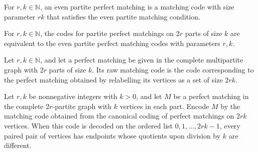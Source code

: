 \begin{definition}
\label{FABL.EvenPartitePerfectMatching}
\leanok
{}
For $r,k\in\mathbb{N}$, an even partite perfect matching is a matching code with size
parameter $rk$ that satisfies the even partite matching condition.
\end{definition}

\begin{definition}
\label{FABL.partitePerfectMatchingEvenEquiv}
\leanok
{}
For $r,k\in\mathbb{N}$, the codes for partite perfect matchings on $2r$ parts of size
$k$ are equivalent to the even partite perfect matching codes with parameters $r,k$.
\end{definition}

\begin{definition}
\label{FABL.graphPartiteMatchingCodeRaw}
\leanok
{}
Let $r,k\in\mathbb{N}$, and let a perfect matching be given in the complete multipartite
graph with $2r$ parts of size $k$. Its raw matching code is the code corresponding to
the perfect matching obtained by relabelling its vertices as a set of size $2rk$.
\end{definition}

\begin{theorem}
\label{FABL.graphPartiteMatchingCodeRaw_isEvenPartite}
\leanok
{}
Let $r,k$ be nonnegative integers with $k>0$, and let $M$ be a perfect matching in the
complete $2r$-partite graph with $k$ vertices in each part. Encode $M$ by the matching
code obtained from the canonical coding of perfect matchings on $2rk$ vertices. When
this code is decoded on the ordered list $0,1,\ldots,2rk-1$, every paired pair of
vertices has endpoints whose quotients upon division by $k$ are different.
\end{theorem}

